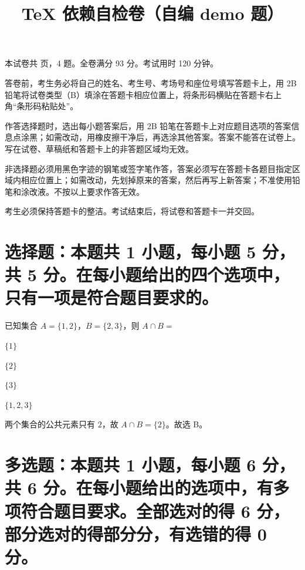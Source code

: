 \documentclass[fontset=fandol]{exam-zh}
\title{TeX 依赖自检卷（自编 demo 题）}
\begin{document}
\secret
\maketitle
本试卷共 \pageref{LastPage} 页，4 题。全卷满分 93 分。考试用时 120 分钟。

\begin{notice}
  \item 答卷前，考生务必将自己的姓名、考生号、考场号和座位号填写答题卡上，用 2B 铅笔将试卷类型（B）填涂在答题卡相应位置上，将条形码横贴在答题卡右上角“条形码粘贴处”。
  \item 作答选择题时，选出每小题答案后，用 2B 铅笔在答题卡上对应题目选项的答案信息点涂黑；如需改动，用橡皮擦干净后，再选涂其他答案。答案不能答在试卷上。写在试卷、草稿纸和答题卡上的非答题区域均无效。
  \item 非选择题必须用黑色字迹的钢笔或签字笔作答，答案必须写在答题卡各题目指定区域内相应位置上；如需改动，先划掉原来的答案，然后再写上新答案；不准使用铅笔和涂改液。不按以上要求作答无效。
  \item 考生必须保持答题卡的整洁。考试结束后，将试卷和答题卡一并交回。
\end{notice}

\section{选择题：本题共 1 小题，每小题 5 分，共 5 分。在每小题给出的四个选项中，只有一项是符合题目要求的。}

\begin{question}
已知集合 $A=\{1,2\}$，$B=\{2,3\}$，则 $A\cap B=${\color{amtiAnsRed}\paren[B]}
\begin{choices}[columns = 4]
  \item $\{1\}$
  \item $\{2\}$
  \item $\{3\}$
  \item $\{1,2,3\}$
\end{choices}
\begin{solution}
两个集合的公共元素只有 $2$，故 $A\cap B=\{2\}$。故选 B。
\end{solution}
\end{question}

\section{多选题：本题共 1 小题，每小题 6 分，共 6 分。在每小题给出的选项中，有多项符合题目要求。全部选对的得 6 分，部分选对的得部分分，有选错的得 0 分。}
\end{document}
